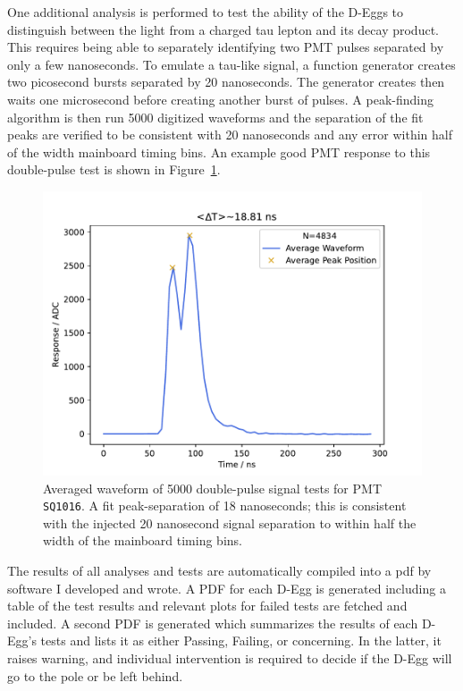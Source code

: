 \documentclass[main.tex]{subfiles}
\begin{document}
One additional analysis is performed to test the ability of the D-Eggs to distinguish between the light from a charged tau lepton and its decay product. 
This requires being able to separately identifying two PMT pulses separated by only a few nanoseconds. 
To emulate a tau-like signal, a function generator creates two picosecond bursts separated by 20 nanoseconds. 
The generator creates then waits one microsecond before creating another burst of pulses. 
A peak-finding algorithm is then run 5000 digitized waveforms and the separation of the fit peaks are verified to be consistent with 20 nanoseconds and any error within half of the width mainboard timing bins.
An example good PMT response to this double-pulse test is shown in Figure~\ref{fig:double_pulse}.

\begin{figure}
    \centering
    \includegraphics[width=0.8\linewidth]{figures/ave_wf_bl_sub_every_wf_DEgg2021-3-082_SQ1016.pdf}
    \caption{Averaged waveform of 5000 double-pulse signal tests for PMT \texttt{SQ1016}. A fit peak-separation of 18 nanoseconds; this is consistent with the injected 20 nanosecond signal separation to within half the width of the mainboard timing bins.}\label{fig:double_pulse}
\end{figure}

The results of all analyses and tests are automatically compiled into a pdf by software I developed and wrote.
A PDF for each D-Egg is generated including a table of the test results and relevant plots for failed tests are fetched and included. 
A second PDF is generated which summarizes the results of each D-Egg's tests and lists it as either Passing, Failing, or concerning. 
In the latter, it raises warning, and individual intervention is required to decide if the D-Egg will go to the pole or be left behind. 
\end{document}
